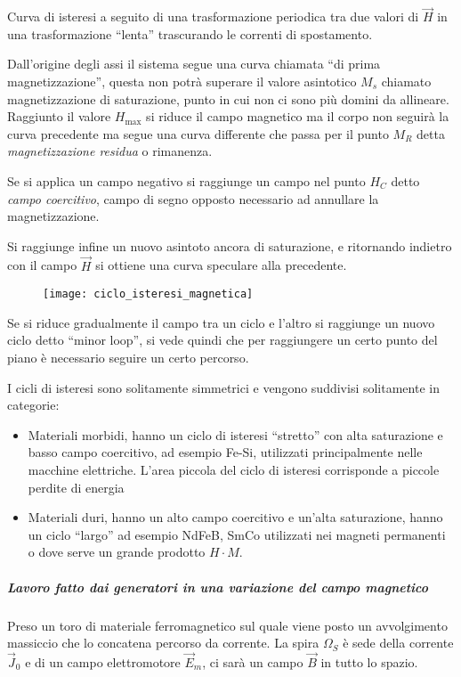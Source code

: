 Curva di isteresi a seguito di una trasformazione periodica tra due valori di $\vec{H}$
in una trasformazione ``lenta'' trascurando le correnti di spostamento.

Dall'origine degli assi il sistema segue una curva chiamata ``di prima magnetizzazione'',
questa non potrà superare il valore asintotico $M_s$ chiamato magnetizzazione di 
saturazione, punto in cui non ci sono più domini da allineare. Raggiunto il valore $H_{\text{max}}$ si riduce il campo magnetico ma il corpo non seguirà la curva precedente 
ma segue una curva differente che passa per il punto $M_R$ detta 
\textit{magnetizzazione residua} o rimanenza.

Se si applica un campo negativo si raggiunge un campo nel punto $H_C$ detto \textit{campo 
coercitivo}, campo di segno opposto necessario ad annullare la magnetizzazione.

Si raggiunge infine un nuovo asintoto ancora di saturazione, e ritornando indietro
con il campo $\vec{H}$ si ottiene una curva speculare alla precedente.

\begin{figure}[H]
\centering
\texttt{[image: ciclo\_isteresi\_magnetica]}
\end{figure}

Se si riduce gradualmente il campo tra un ciclo e l'altro si raggiunge un nuovo ciclo detto
``minor loop'', si vede quindi che per raggiungere un certo punto del piano è necessario
seguire un certo percorso.

I cicli di isteresi sono solitamente simmetrici e vengono suddivisi solitamente
in categorie:
\begin{itemize}
\item Materiali morbidi, hanno un ciclo di isteresi ``stretto'' con alta saturazione e 
basso campo coercitivo, ad esempio Fe-Si, utilizzati principalmente nelle macchine
elettriche. L'area piccola del ciclo di isteresi corrisponde a piccole perdite di energia
\item Materiali duri, hanno un alto campo coercitivo e un'alta saturazione, hanno un ciclo
``largo'' ad esempio NdFeB, SmCo utilizzati nei magneti permanenti o dove serve 
un grande prodotto $H\cdot M$.
\end{itemize}

\subparagraph{Lavoro fatto dai generatori in una variazione del campo magnetico}
Preso un toro di materiale ferromagnetico sul quale viene posto un avvolgimento massiccio 
che lo concatena percorso da corrente.
La spira $\Omega_S$ è sede della corrente $\vec{J}_0$ e di un campo elettromotore 
$\vec{E}_m$, ci sarà un campo $\vec{B}$ in tutto lo spazio.

